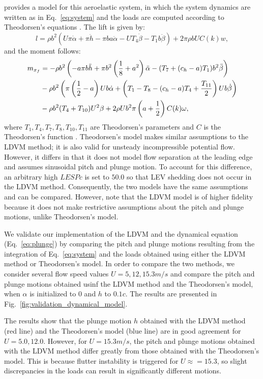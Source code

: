\documentclass[a4paper,12pt]{article}
\begin{document}
\cite{dimitriadis2017introduction} provides a model for this aeroelastic system, in which the system dynamics are written as in Eq.~\ref{eq:system} and the loads are computed according to Theodorsen's equations \citep{theodorsen1935general}.
The lift is given by:
\begin{equation}
    l=\rho b^2(U\pi\dot{\alpha}+\pi\ddot{h}-\pi ba\ddot{\alpha}- U T_4 \dot{\beta}-T_1b\ddot{\beta}) +2 \pi \rho b U C(k) w, 
    \label{Eq:lift}
\end{equation}
and the moment follows:
\begin{align}
    m_{x_f}&=-\rho b^2 \left(-a\pi b \ddot{h} +\pi b^2\left(\frac{1}{8}+a^2 \right)\ddot{\alpha} -(T_7+(c_h-a)T_1)b^2\ddot{\beta}\right)\notag\\
    &-\rho b^2 \left( \pi \left(\frac{1}{2}-a\right) U b\dot{\alpha} +\left( T_1-T_8-(c_h-a)T_4+\frac{T_{11}}{2}\right) Ub \dot{\beta}\right)\notag\\
    & - \rho b^2 (T_4+T_{10}) U^2 {\beta} + 2 \rho U b^2 \pi \left(a +\frac{1}{2}\right) C(k) \omega,
    \label{Eq:moment}
\end{align}
where $T_1, T_4, T_7, T_8, T_{10}, T_{11}$ are Theodorsen's parameters and $C$ is the Theodorsen's function \citep{theodorsen1935general}.
Theodorsen's model makes similar assumptions to the LDVM method; it is also valid for unsteady incompressible potential flow.
However, it differs in that it does not model flow separation at the leading edge and assumes sinusoidal pitch and plunge motion.
To account for this difference, an arbitrary high $LESPc$ is set to $50.0$ so that LEV shedding does not occur in the LDVM method. Consequently, the two models have the same assumptions and can be compared.
However, note that the LDVM model is of higher fidelity because it does not make restrictive assumptions about the pitch and plunge motions, unlike Theodorsen's model.

We validate our implementation of the LDVM and the dynamical equation (Eq.~\ref{eq:plunge}) by comparing the pitch and plunge motions resulting from the integration of Eq.~\ref{eq:system} and the loads obtained using either the LDVM method or Theodorsen's model.
In order to compare the two methods, we consider several flow speed values $U =5,12,15.3 m/s$ and compare the pitch and plunge motions obtained usinf the LDVM method and the Theodorsen's model, when $\alpha$ is initialized to $0$ and $h$ to $0.1c$.
The results are presented in Fig.~\ref{fig:validation_dynamical_model}.

The results show that the plunge motion $h$ obtained with the LDVM method (red line) and the Theodorsen's model (blue line) are in good agreement for $U = 5.0,12.0$.
However, for $U=15.3 m/s$, the pitch and plunge motions obtained with the LDVM method  differ greatly from those obtained with the Theodorsen's model. This is because flutter instability is triggered for $U\approx=15.3$, so slight discrepancies in the loads can result in significantly different motions.
\end{document}
